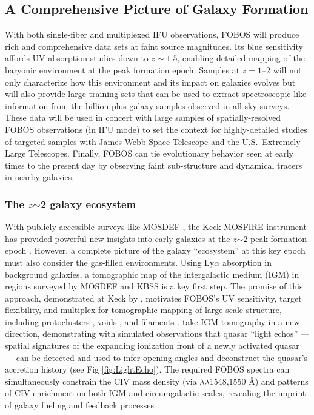
\subsection{A Comprehensive Picture of Galaxy Formation}

With both single-fiber and multiplexed IFU observations, FOBOS will produce rich and comprehensive data sets at faint source magnitudes.  Its blue sensitivity affords UV absorption studies down to $z \sim 1.5$, enabling detailed mapping of the baryonic environment at the peak formation epoch.  Samples at $z=1$--$2$ will not only characterize how this environment and its impact on galaxies evolves but will also provide large training sets that can be used to extract spectroscopic-like information from the billion-plus galaxy samples observed in all-sky surveys.  These data will be used in concert with large samples of spatially-resolved FOBOS observations (in IFU mode) to set the context for highly-detailed studies of targeted samples with James Webb Space Telescope and the U.S.~Extremely Large Telescopes.  Finally, FOBOS can tie evolutionary behavior seen at early times to the present day by observing faint sub-structure and dynamical tracers in nearby galaxies.

\subsubsection{The $z$$\sim$2 galaxy ecosystem}
\label{sec:z2galaxies}

With publicly-accessible surveys like MOSDEF \citep{kriek15}, the Keck MOSFIRE instrument has provided powerful new
insights into early galaxies at the $z$$\sim$2 peak-formation epoch \citep[also see KBSS,][]{steidel14}. However, a complete
picture of the galaxy ``ecosystem'' at this key epoch must also consider the gas-filled environments. Using Ly$\alpha$
absorption in background galaxies, a tomographic map of the intergalactic medium (IGM) in regions surveyed by MOSDEF
and KBSS is a key first step. The promise of this approach, demonstrated at Keck by \citet{lee14}, motivates FOBOS's UV
sensitivity, target flexibility, and multiplex for tomographic mapping of large-scale structure, including
protoclusters \citep{lee16,kartaltepe19}, voids \citep{krolewski18}, and filaments \citep{horowitz19}.
\citet{2018arXiv181005156S} take IGM tomography in a new direction, demonstrating with simulated observations that
quasar ``light echos''
--- spatial signatures of the expanding ionization front of a newly
activated quasar --- can be detected and used to infer opening angles
and deconstruct the quasar's accretion history (see Fig
\ref{fig:LightEcho}). The required FOBOS spectra can simultaneously
constrain the CIV mass density (via $\lambda\lambda$1548,1550 \AA)
and patterns of CIV enrichment on both IGM and circumgalactic scales,
revealing the imprint of galaxy fueling and feedback processes
\citep[e.g.,][]{tumlinson17}.

